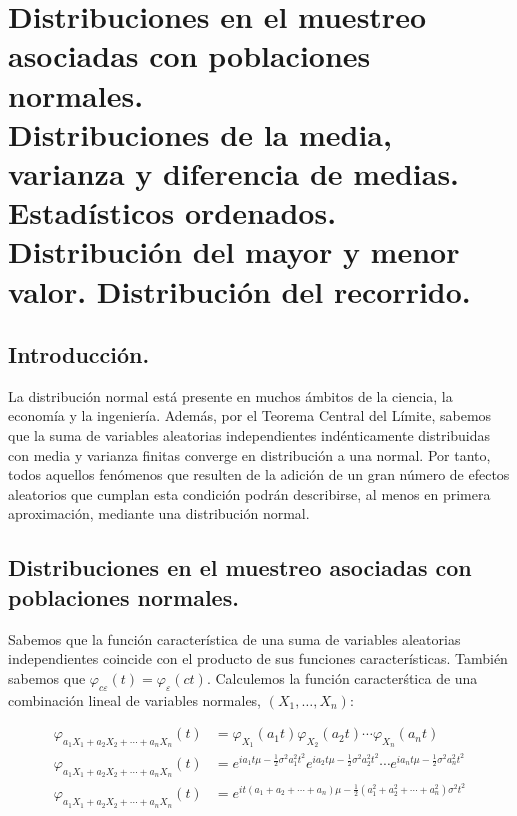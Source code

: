 \chapter[Distribuciones en el muestreo asociadas con poblaciones normales.]{Distribuciones en el muestreo asociadas con poblaciones normales. \\
\normalsize Distribuciones de la media, varianza y diferencia de medias. Estad\'isticos ordenados. Distribuci\'on del mayor y menor valor. Distribuci\'on del recorrido.}

\section{Introducci\'on.}

La distribuci\'on normal est\'a presente en muchos \'ambitos de la ciencia, la econom\'ia y la ingenier\'ia. Adem\'as, por el Teorema Central del L\'imite, sabemos que la suma de variables aleatorias independientes ind\'enticamente distribuidas con media y varianza finitas converge en distribuci\'on a una normal. Por tanto, todos aquellos fen\'omenos que resulten de la adici\'on de un gran n\'umero de efectos aleatorios que cumplan esta condici\'on podr\'an describirse, al menos en primera aproximaci\'on, mediante una distribuci\'on normal.

\section{Distribuciones en el muestreo asociadas con poblaciones normales.}

Sabemos que la funci\'on caracter\'istica de una suma de variables aleatorias independientes coincide con el producto de sus funciones caracter\'isticas. Tambi\'en sabemos que $\varphi_{c\varepsilon}(t)=\varphi_{\varepsilon}(ct)$. Calculemos la funci\'on caracter\'stica de una combinaci\'on lineal de variables normales, $(X_1,\ldots,X_n)$:

\begin{align*}
  \varphi_{a_1X_1+a_2X_2+\cdots+a_nX_n}(t) & = \varphi_{X_1}(a_1t)\varphi_{X_2}(a_2t)\cdots\varphi_{X_n}(a_nt)  \\
  \varphi_{a_1X_1+a_2X_2+\cdots+a_nX_n}(t) & = e^{ia_1t\mu-\frac{1}{2}\sigma^2a_1^2t^2}e^{ia_2t\mu-\frac{1}{2}\sigma^2a_2^2t^2} \cdots e^{ia_nt\mu-\frac{1}{2}\sigma^2a_n^2t^2} \\
  \varphi_{a_1X_1+a_2X_2+\cdots+a_nX_n}(t) & = e^{it(a_1+a_2+\cdots+a_n)\mu-\frac{1}{2}(a_1^2+a_2^2+\cdots+a_n^2)\sigma^2t^2} 
\end{align*}

